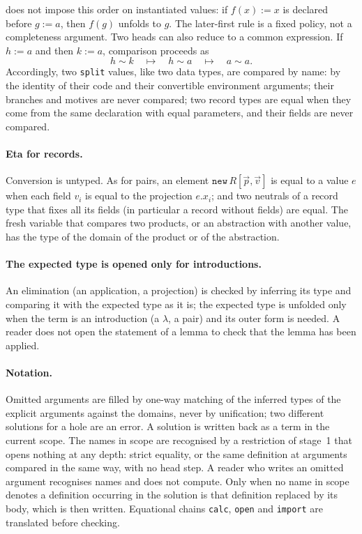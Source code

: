 \documentclass[11pt]{article}
\newcommand{\kw}[1]{\texttt{#1}}
\begin{document}
does not impose this order on instantiated values: if $f(x):=x$ is
declared before $g:=a$, then $f(g)$ unfolds to $g$. The later-first rule
is a fixed policy, not a completeness argument. Two heads can also
reduce to a common expression. If $h:=a$ and then $k:=a$, comparison
proceeds as
\[
  h\mathrel{\sim}k\quad\longmapsto\quad
  h\mathrel{\sim}a\quad\longmapsto\quad a\mathrel{\sim}a.
\]
Accordingly, two \kw{split} values, like two data types, are compared by
name: by the identity of their code and their convertible environment
arguments; their branches and motives are never compared;
two record types are equal when they come from the same declaration with
equal parameters, and their fields are never compared.

\paragraph{Eta for records.} Conversion is untyped. As for pairs, an
element $\kw{new}\,R[\vec p,\vec v]$ is equal to a value $e$ when each
field $v_i$ is equal to the projection $e.x_i$; and two neutrals of a
record type that fixes all its fields (in particular a record without
fields) are equal. The fresh variable that compares two products, or an
abstraction with another value, has the type of the domain of the
product or of the abstraction.

\paragraph{The expected type is opened only for introductions.} An elimination (an application, a
projection) is checked by inferring its type and comparing it with the
expected type as it is; the expected type is unfolded only when the term
is an introduction (a $\lambda$, a pair) and its outer form is needed.
A reader does not open the statement of a lemma to check that the lemma
has been applied.

\paragraph{Notation.} Omitted arguments are filled by one-way matching
of the inferred types of the explicit arguments against the domains,
never by unification; two different solutions for a hole are an error.
A solution is written back as a term in the current scope. The names in
scope are recognised by a restriction of stage~1 that opens nothing at
any depth: strict equality, or the same definition at arguments compared
in the same way, with no head step. A reader who writes an omitted
argument recognises names and does not compute. Only when no name in
scope denotes a definition occurring in the solution is that definition
replaced by its body, which is then written. Equational chains
\kw{calc}, \kw{open} and \kw{import} are translated before checking.
\end{document}
